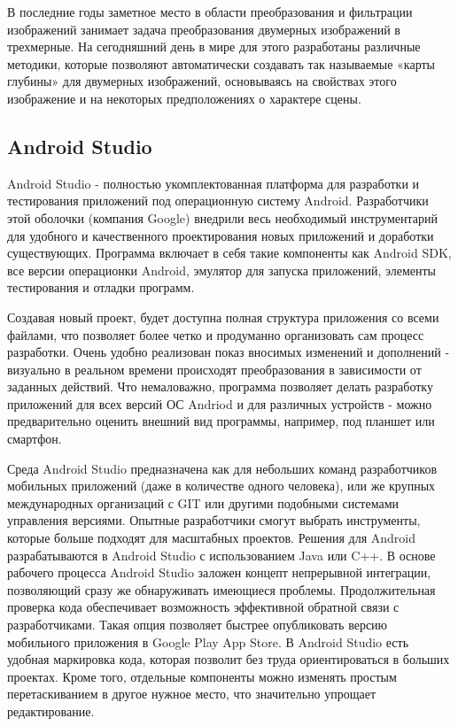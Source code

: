 В последние годы заметное место в области преобразования и фильтрации изображений занимает задача преобразования двумерных изображений в трехмерные. На сегодняшний день в мире для этого разработаны различные методики, которые позволяют автоматически создавать так называемые «карты глубины» для двумерных изображений, основываясь на свойствах этого изображение и на некоторых предположениях о характере сцены. 

\subsection{Android Studio}
Android Studio - полностью укомплектованная платформа для разработки и тестирования приложений под операционную систему Android. Разработчики этой оболочки (компания Google) внедрили весь необходимый инструментарий для удобного и качественного проектирования новых приложений и доработки существующих. Программа включает в себя такие компоненты как Android SDK, все версии операционки Android, эмулятор для запуска приложений, элементы тестирования и отладки программ.

Создавая новый проект, будет доступна полная структура приложения со всеми файлами, что позволяет более четко и продуманно организовать сам процесс разработки. Очень удобно реализован показ вносимых изменений и дополнений - визуально в реальном времени происходят преобразования в зависимости от заданных действий. Что немаловажно, программа позволяет делать разработку приложений для всех версий ОС Andriod и для различных устройств - можно предварительно оценить внешний вид программы, например, под планшет или смартфон.

Среда Android Studio предназначена как для небольших команд разработчиков мобильных приложений (даже в количестве одного человека), или же крупных международных организаций с GIT или другими подобными системами управления версиями. Опытные разработчики смогут выбрать инструменты, которые больше подходят для масштабных проектов. Решения для Android разрабатываются в Android Studio с использованием Java или C++. В основе рабочего процесса Android Studio заложен концепт непрерывной интеграции, позволяющий сразу же обнаруживать имеющиеся проблемы. Продолжительная проверка кода обеспечивает возможность эффективной обратной связи с разработчиками. Такая опция позволяет быстрее опубликовать версию мобильного приложения в Google Play App Store. В Android Studio есть удобная маркировка кода, которая позволит без труда ориентироваться в больших проектах. Кроме того, отдельные компоненты можно изменять простым перетаскиванием в другое нужное место, что значительно упрощает редактирование.

